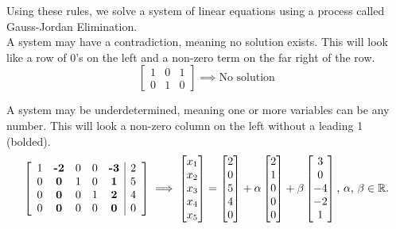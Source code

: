 \noindent
Using these rules, we solve a system of linear equations using a process called Gauss-Jordan Elimination.\\

\noindent
A system may have a contradiction, meaning no solution exists. This will look like a row of 0's on the left and a non-zero term on the far right of the row.
\begin{equation*}
	\left[
		\begin{array}{cc|c}
		1 & 0 & 1 \\
		0 & 1 & 0
		\end{array}
	\right]
	\implies
	\text{No solution}
\end{equation*}

\noindent
A system may be underdetermined, meaning one or more variables can be any number. This will look a non-zero column on the left without a leading 1 (bolded).
\begin{equation*}
	\left[
		\begin{array}{ccccc|c}
			1 & \textbf{-2} & 0 & 0 & \textbf{-3} & 2 \\
			0 & \textbf{0} & 1 & 0 & \textbf{1} & 5 \\
			0 & \textbf{0} & 0 & 1 & \textbf{2} & 4 \\
			0 & \textbf{0} & 0 & 0 & \textbf{0} & 0
		\end{array}
	\right]
	\implies
	\begin{bmatrix}
		x_1 \\
		x_2 \\
		x_3 \\
		x_4 \\
		x_5 \\
	\end{bmatrix} = \begin{bmatrix}
		2 \\
		0 \\
		5 \\
		4 \\
		0
	\end{bmatrix} + \alpha \begin{bmatrix}
		2 \\
		1 \\
		0 \\
		0 \\
		0
	\end{bmatrix} + \beta \begin{bmatrix}
		3 \\
		0 \\
		-4 \\
		-2 \\
		1
	\end{bmatrix} \text{, }\alpha\text{, }\beta \in \mathbb{R}.
\end{equation*}

